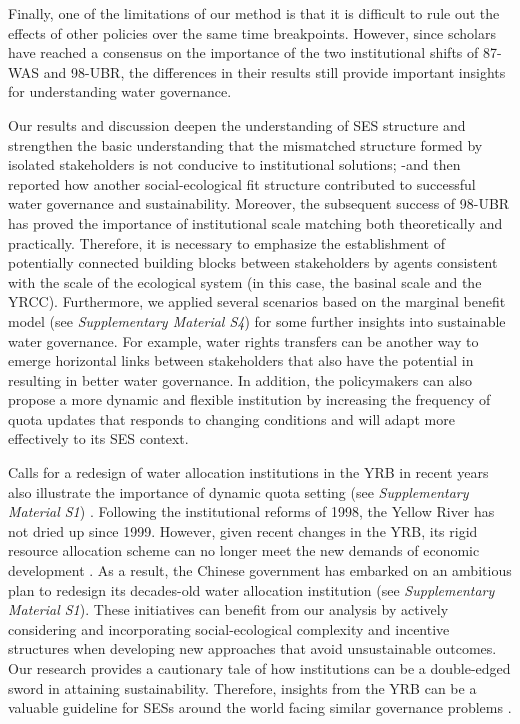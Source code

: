 Finally, one of the limitations of our method is that it is difficult to rule out the effects of other policies over the same time breakpoints.
However, since scholars have reached a consensus on the importance of the two institutional shifts of 87-WAS and 98-UBR, the differences in their results still provide important insights for understanding water governance.

Our results and discussion deepen the understanding of SES structure and strengthen the basic understanding that the mismatched structure formed by isolated stakeholders is not conducive to institutional solutions; -and then reported how another social-ecological fit structure contributed to successful water governance and sustainability.
Moreover, the subsequent success of 98-UBR has proved the importance of institutional scale matching both theoretically and practically. Therefore, it is necessary to emphasize the establishment of potentially connected building blocks between stakeholders by agents consistent with the scale of the ecological system (in this case, the basinal scale and the YRCC).
Furthermore, we applied several scenarios based on the marginal benefit model (see \textit{Supplementary Material S4}) for some further insights into sustainable water governance.
For example, water rights transfers can be another way to emerge horizontal links between stakeholders that also have the potential in resulting in better water governance.
In addition, the policymakers can also propose a more dynamic and flexible institution by increasing the frequency of quota updates that responds to changing conditions and will adapt more effectively to its SES context.

Calls for a redesign of water allocation institutions in the YRB in recent years also illustrate the importance of dynamic quota setting (see \textit{Supplementary Material S1}) \cite{yu2019}. Following the institutional reforms of 1998, the Yellow River has not dried up since 1999. However, given recent changes in the YRB, its rigid resource allocation scheme can no longer meet the new demands of economic development \cite{wang2019a}. As a result, the Chinese government has embarked on an ambitious plan to redesign its decades-old water allocation institution (see \textit{Supplementary Material S1}). These initiatives can benefit from our analysis by actively considering and incorporating social-ecological complexity and incentive structures when developing new approaches that avoid unsustainable outcomes. Our research provides a cautionary tale of how institutions can be a double-edged sword in attaining sustainability. Therefore, insights from the YRB can be a valuable guideline for SESs around the world facing similar governance problems \cite{cumming2020b, muneepeerakul2017, cumming2020a, leslie2015}.
